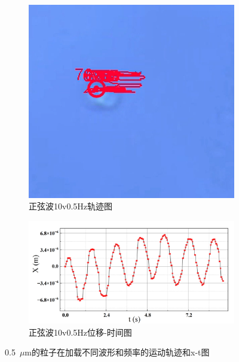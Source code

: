 \documentclass[a4paper]{report} %
\begin{document}
\begin{figure}[H]
    \begin{subfigure}{0.25\textwidth}
        \includegraphics[width=\linewidth]{sin10v0.5Hz1.png}
        \caption{正弦波10v0.5Hz轨迹图}
    \end{subfigure}
    \begin{subfigure}{0.45\textwidth}
        \includegraphics[width=\linewidth]{sin10v0.5Hz.png}
        \caption{正弦波10v0.5Hz位移-时间图}
    \end{subfigure}

    \caption{0.5~$\mu$m的粒子在加载不同波形和频率的运动轨迹和x-t图}
\end{figure}
\end{document}

